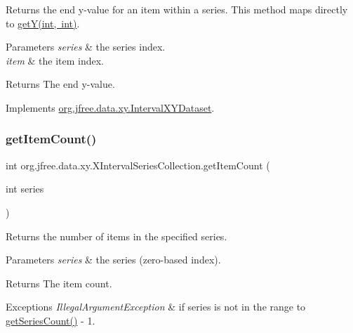Returns the end y-\/value for an item within a series. This method maps directly to \mbox{\hyperlink{classorg_1_1jfree_1_1data_1_1xy_1_1_x_interval_series_collection_ae156ad8d79e2278653592a74680ce835}{get\+Y(int, int)}}.


\begin{DoxyParams}{Parameters}
{\em series} & the series index. \\
\hline
{\em item} & the item index.\\
\hline
\end{DoxyParams}
\begin{DoxyReturn}{Returns}
The end y-\/value. 
\end{DoxyReturn}


Implements \mbox{\hyperlink{interfaceorg_1_1jfree_1_1data_1_1xy_1_1_interval_x_y_dataset_ae938af574bad07e7f47a8b423223ef9b}{org.\+jfree.\+data.\+xy.\+Interval\+X\+Y\+Dataset}}.

\mbox{\label{classorg_1_1jfree_1_1data_1_1xy_1_1_x_interval_series_collection_a54e146ea83bd2dfe56966ac098e9c502}} 
\subsubsection{\texorpdfstring{get\+Item\+Count()}{getItemCount()}}
{\footnotesize\ttfamily int org.\+jfree.\+data.\+xy.\+X\+Interval\+Series\+Collection.\+get\+Item\+Count (\begin{DoxyParamCaption}\item[{int}]{series }\end{DoxyParamCaption})}

Returns the number of items in the specified series.


\begin{DoxyParams}{Parameters}
{\em series} & the series (zero-\/based index).\\
\hline
\end{DoxyParams}
\begin{DoxyReturn}{Returns}
The item count.
\end{DoxyReturn}

\begin{DoxyExceptions}{Exceptions}
{\em Illegal\+Argument\+Exception} & if {\ttfamily series} is not in the range {} to {\ttfamily \mbox{\hyperlink{classorg_1_1jfree_1_1data_1_1xy_1_1_x_interval_series_collection_ad9ed84e38a8cce0df6501925618efdf7}{get\+Series\+Count()}} -\/ 1}. \\
\hline
\end{DoxyExceptions}


